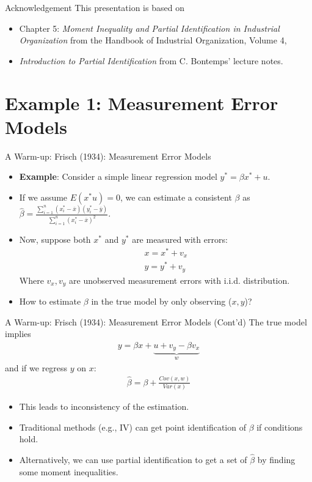 \documentclass[aspectratio=169]{beamer}  %
\begin{document}
\begin{frame}{Acknowledgement}
This presentation is based on
    \begin{itemize}
        \item Chapter 5: \textit{Moment Inequality and Partial Identification in Industrial Organization} from the Handbook of Industrial Organization, Volume 4,
        \item \textit{Introduction to Partial Identification} from C. Bontemps' lecture notes.
    \end{itemize}
\end{frame}

\section{Example 1: Measurement Error Models}

\begin{frame}{A Warm-up: Frisch (1934): Measurement Error Models}
    \begin{itemize}
        \item \textbf{Example}: Consider a simple linear regression model $y^* = \beta x^* + u$.
        \item If we assume $E(x^* u) = 0$, we can estimate a consistent $\beta$ as $\hat{\beta} = \frac{\sum_{i=1}^n (x^*_i - \overline{x}) (y^*_i - \overline{y})}{\sum_{i=1}^n (x^{*}_{i} - \overline{x})^2}$.
        \item Now, suppose both $x^*$ and $y^*$ are measured with errors:
        \begin{align*}
        x = x^* + v_x \\
        y = y^* + v_y
        \end{align*}
        Where $v_x, v_y$ are unobserved measurement errors with i.i.d. distribution.
        \item How to estimate $\beta$ in the true model by only observing ($x, y$)?
    \end{itemize}
\end{frame}

\begin{frame}{A Warm-up: Frisch (1934): Measurement Error Models (Cont'd)}
    The true model implies
    \begin{align*}
    y = \beta x + \underbrace{u + v_y - \beta v_x }_{w}
    \end{align*}
    and if we regress $y$ on $x$:
    \begin{align*}
    \hat{\beta} = \beta + \frac{Cov(x, w)}{Var(x)}
    \end{align*}
\begin{itemize}
    \item This leads to inconsistency of the estimation. 
    \item Traditional methods (e.g., IV) can get point identification of $\beta$ if conditions hold.
    \item Alternatively, we can use partial identification to get a set of $\hat{\beta}$ by finding some moment inequalities.
\end{itemize}

\end{frame}
\end{document}

